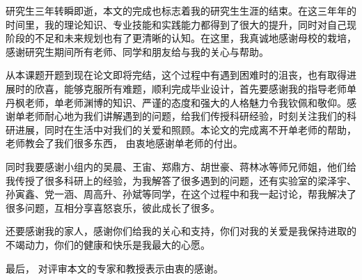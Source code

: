 
研究生三年转瞬即逝，本文的完成也标志着我的研究生生涯的结束。在这三年年的时间里，我的理论知识、专业技能和实践能力都得到了很大的提升，同时对自己现阶段的不足和未来规划也有了更清晰的认知。在这里，我真诚地感谢母校的栽培，感谢研究生期间所有老师、同学和朋友给与我的关心与帮助。

从本课题开题到现在论文即将完结，这个过程中有遇到困难时的沮丧，也有取得进展时的欣喜，能够克服所有难题，顺利完成毕业设计，首先要感谢我的指导老师单丹枫老师，单老师渊博的知识、严谨的态度和强大的人格魅力令我钦佩和敬仰。感谢单老师耐心地为我们讲解遇到的问题，给我们传授科研经验，时刻关注我们的科研进展，同时在生活中对我们的关爱和照顾。本论文的完成离不开单老师的帮助，老师教会了我们很多东西， 由衷地感谢单老师的付出。

同时我要感谢小组内的吴晨、王宙、郑鼎方、胡世豪、蒋林冰等师兄师姐，他们给我传授了很多科研上的经验，为我解答了很多遇到的问题，还有实验室的梁泽宇、孙寅鑫、党一涵、周高升、孙斌等同学，在这个过程中和我一起讨论，帮我解决了很多问题，互相分享喜怒哀乐，彼此成长了很多。

还要感谢我的家人，感谢你们给我的关心和支持，你们对我的关爱是我保持进取的不竭动力，你们的健康和快乐是我最大的心愿。

最后， 对评审本文的专家和教授表示由衷的感谢。